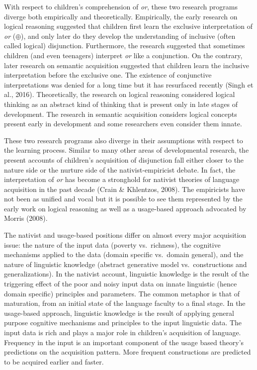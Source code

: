 \documentclass[oneside]{report}
\theoremstyle{definition}
\theoremstyle{definition}
\theoremstyle{definition}
\theoremstyle{remark}
\begin{document}
With respect to children's comprehension of \emph{or}, these two
research programs diverge both empirically and theoretically.
Empirically, the early research on logical reasoning suggested that
children first learn the exclusive interpretation of \emph{or}
(\(\oplus\)), and only later do they develop the understanding of
inclusive (often called logical) disjunction. Furthermore, the research
suggested that sometimes children (and even teenagers) interpret
\emph{or} like a conjunction. On the contrary, later research on
semantic acquisition suggested that children learn the inclusive
interpretation before the exclusive one. The existence of conjunctive
interpretations was denied for a long time but it has resurfaced
recently (Singh et al., 2016). Theoretically, the research on logical
reasoning considered logical thinking as an abstract kind of thinking
that is present only in late stages of development. The research in
semantic acquisition considers logical concepts present early in
development and some researchers even consider them innate.

These two research programs also diverge in their assumptions with
respect to the learning process. Similar to many other areas of
developmental research, the present accounts of children's acquisition
of disjunction fall either closer to the nature side or the nurture side
of the nativist-empiricist debate. In fact, the interpretation of
\emph{or} has become a stronghold for nativist theories of language
acquisition in the past decade (Crain \& Khlentzos, 2008). The
empiricists have not been as unified and vocal but it is possible to see
them represented by the early work on logical reasoning as well as a
usage-based approach advocated by Morris (2008).

The nativist and usage-based positions differ on almost every major
acquisition issue: the nature of the input data (poverty vs.~richness),
the cognitive mechanisms applied to the data (domain specific vs.~domain
general), and the nature of linguistic knowledge (abstract generative
model vs.~constructions and generalizations). In the nativist account,
linguistic knowledge is the result of the triggering effect of the poor
and noisy input data on innate linguistic (hence domain specific)
principles and parameters. The common metaphor is that of maturation,
from an initial state of the language faculty to a final stage. In the
usage-based approach, linguistic knowledge is the result of applying
general purpose cognitive mechanisms and principles to the input
linguistic data. The input data is rich and plays a major role in
children's acquisition of language. Frequency in the input is an
important component of the usage based theory's predictions on the
acquisition pattern. More frequent constructions are predicted to be
acquired earlier and faster.
\end{document}
